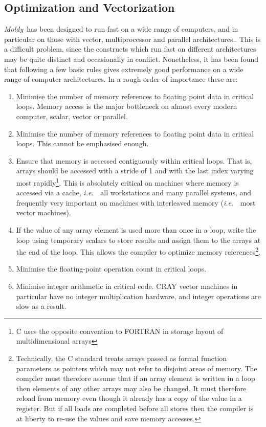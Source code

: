 \documentclass[twoside]{report}
\newcommand{\moldy}{{\em Moldy}}
\newcommand{\ie}{{\em i.e}.\ }
\begin{document}
\subsection{Optimization and Vectorization}
\moldy\  has been designed to run fast on a wide range of computers, and
in particular on those with vector, multiprocessor and
parallel architectures.. This is a difficult
problem, since the constructs which run fast on different
architectures may be quite distinct and occasionally in conflict.
Nonetheless, it has been found that following a few basic rules gives
extremely good performance on a wide range of computer architectures.
In a rough order of importance these are:
\begin{enumerate}
\item Minimise the number of memory references to floating point data
  in critical loops.  Memory access is the major bottleneck on almost
  every modern computer, scalar, vector or parallel.
\item Minimise the number of memory references to floating point data
  in critical loops.  This cannot be emphasised enough.
\item Ensure that memory is accessed contiguously within critical
  loops. That is, arrays should be accessed with a stride of 1 and
  with the last index varying most rapidly\footnote{C uses the
    opposite convention to FORTRAN in storage layout of
    multidimensional arrays}.  This is absolutely critical on machines
  where memory is accessed via a cache, \ie\ all workstations and many
  parallel systems, and frequently very important on machines with
  interleaved memory (\ie\ most vector machines).
\item If the value of any array element is used more than once in a
  loop, write the loop using temporary scalars to store results and
  assign them to the arrays at the end of the loop. This allows the
  compiler to optimize memory references\footnote{Technically, the C
    standard treats arrays passed as formal function parameters as
    pointers which may not refer to disjoint areas of memory.  The
    compiler must therefore assume that if an array element is written
    in a loop then elements of any other arrays may also be changed.
    It must therefore reload from memory even though it already has a
    copy of the value in a register. But if all loads are completed
    before all stores then the compiler is at liberty to re-use the
    values and save memory accesses.}.
\item Minimise the floating-point operation count in critical loops.
\item Minimise integer arithmetic in critical code.  CRAY vector
  machines in particular have no integer multiplication hardware,
  and integer operations are slow as a result.
\end{enumerate}
\end{document}
